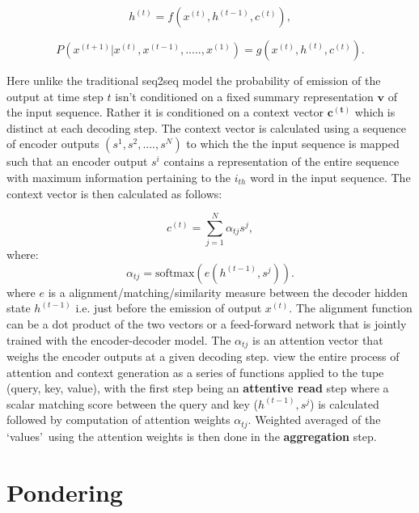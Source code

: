 \begin{equation}\label{attn:eqn1}
h^{(t)} = f(x^{(t)}, h^{(t-1)}, c^{(t)}),
\end{equation}

\begin{equation} \label{attn:eqn2}
P(x^{(t+1)}|x^{(t)}, x^{(t-1)},.....,x^{(1)}) = g(x^{(t)}, h^{(t)}, c^{(t)}).
\end{equation}

Here unlike the traditional seq2seq model the probability of emission of the output at time step $t$ isn't conditioned on a fixed summary representation $\mathbf{v}$ of the input sequence. Rather it is conditioned on a context vector $\mathbf{c^{(t)}}$ which is distinct at each decoding step. The context vector is calculated using a sequence of encoder outputs $(s^1, s^2, ....,s^N)$ to which the the input sequence is mapped such that an encoder output $s^i$ contains a representation of the entire sequence with maximum information pertaining to the $i_{th}$ word in the input sequence. The context vector is then calculated as follows:

\begin{equation}\label{attn:eqn3}
c^{(t)}  = \sum_{j=1}^N \alpha_{tj} s^j,
\end{equation}
where:
\begin{equation}\label{attn:eqn4}
\alpha_{tj} = \text{softmax}(e(h^{(t-1)}, s^j)).
\end{equation}
where $e$ is a alignment/matching/similarity measure between the decoder hidden state $h^{(t-1)}$ i.e. just before the emission of output $x^{(t)}$. The alignment function can be a dot product of the two vectors or a feed-forward network that is jointly trained with the encoder-decoder model. The $\alpha_{tj}$ is an attention vector that weighs the encoder outputs at a given decoding step. \cite{Vaswani2017} view the entire process of attention and context generation as a series of functions applied to the tupe (query, key, value), with the first step being an \textbf{attentive read} step where a scalar matching score between the query and key ($h^{(t-1)}, s^j$) is calculated followed by computation of attention weights $\alpha_{tj}$. Weighted averaged of the \lq values{}\rq\ using the attention weights is then done in the \textbf{aggregation} step.  


\section{Pondering}


